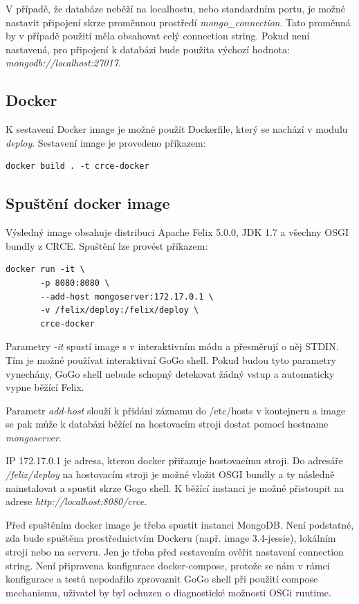 \documentclass[12pt, a4paper]{article}
\begin{document}
V případě, že databáze neběží na localhostu, nebo standardním portu, je možné nastavit připojení skrze proměnnou prostředí \textit{mongo\_connection}. Tato proměnná by v případě použití měla obsahovat celý connection string. Pokud není nastavená, pro připojení k databázi bude použita výchozí hodnota: \textit{mongodb://localhost:27017}.

\subsection{Docker}
K sestavení Docker image je možné použít Dockerfile, který se nachází v modulu \textit{deploy}. Sestavení image je provedeno příkazem:

\begin{verbatim}
docker build . -t crce-docker
\end{verbatim} 

\subsection{Spuštění docker image}

Výsledný image obsahuje distribuci Apache Felix 5.0.0, JDK 1.7 a všechny OSGI bundly z CRCE. Spuštění lze provést příkazem:

\begin{verbatim}
docker run -it \ 
	   -p 8080:8080 \
	   --add-host mongoserver:172.17.0.1 \
	   -v /felix/deploy:/felix/deploy \
	   crce-docker 
\end{verbatim}

Parametry \textit{-it} spustí image s v interaktivním módu a přesměrují o něj STDIN. Tím je možné používat interaktivní GoGo shell. Pokud budou tyto parametry vynechány, GoGo shell nebude schopný detekovat žádný vstup a automaticky vypne běžící Felix.

Parametr \textit{add-host} slouží k přidání záznamu do /etc/hosts v kontejneru a image se pak může k databázi běžící na hostovacím stroji dostat pomocí hostname \textit{mongoserver}. 

IP 172.17.0.1 je adresa, kterou docker přiřazuje hostovacímu stroji. Do adresáře \textit{/felix/deploy} na hostovacím stroji je možné vložit OSGI bundly a ty následně nainstalovat a spustit skrze Gogo shell. K běžící instanci je možné přistoupit na adrese \textit{http://localhost:8080/crce}. 

Před spuštěním docker image je třeba spustit instanci MongoDB. Není podstatné, zda bude spuštěna prostřednictvím Dockeru (např. image 3.4-jessie), lokálním stroji nebo na serveru. Jen je třeba před sestavením ověřit nastavení connection string. Není připravena konfigurace docker-compose, protože se nám v rámci konfigurace a testů nepodařilo zprovoznit GoGo shell při použití compose mechanismu, uživatel by byl ochuzen o diagnostické možnosti OSGi runtime.
\end{document}
